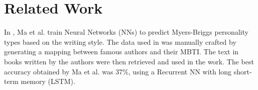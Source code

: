 \section{Related Work}

In \cite{maneural}, Ma et al. train Neural Networks (NNs) to predict Myers-Briggs personality types based on the writing style.
The data used in \cite{maneural} was manually crafted by generating a mapping between famous authors and their MBTI.
The text in books written by the authors were then retrieved and used in the work.
The best accuracy obtained by Ma et al. was 37\%, using a Recurrent NN with long short-term memory (LSTM).
